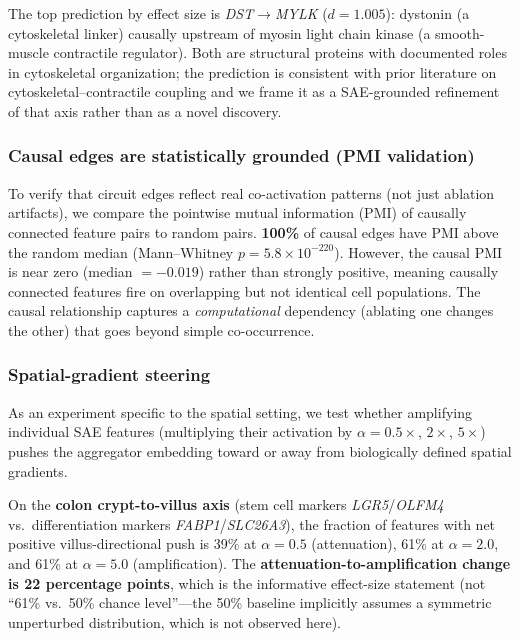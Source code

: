 \documentclass[11pt]{article}
\begin{document}
The top prediction by effect size is \emph{DST}$\to$\emph{MYLK}
($d = 1.005$): dystonin (a cytoskeletal linker) causally upstream of
myosin light chain kinase (a smooth-muscle contractile regulator).
Both are structural proteins with documented roles in cytoskeletal
organization; the prediction is consistent with prior literature on
cytoskeletal--contractile coupling and we frame it as a SAE-grounded
refinement of that axis rather than as a novel discovery.

\subsubsection{Causal edges are statistically grounded (PMI validation)}

To verify that circuit edges reflect real co-activation patterns (not
just ablation artifacts), we compare the pointwise mutual information
(PMI) of causally connected feature pairs to random pairs.
\textbf{100\%} of causal edges have PMI above the random median
(Mann--Whitney $p = 5.8 \times 10^{-220}$). However, the causal PMI
is near zero (median $= -0.019$) rather than strongly positive,
meaning causally connected features fire on overlapping but not
identical cell populations. The causal relationship captures a
\emph{computational} dependency (ablating one changes the other) that
goes beyond simple co-occurrence.

\subsubsection{Spatial-gradient steering}

As an experiment specific to the spatial setting, we test whether
amplifying individual SAE features (multiplying their activation by
$\alpha = 0.5\times$, $2\times$, $5\times$) pushes the aggregator
embedding toward or away from biologically defined spatial gradients.

On the \textbf{colon crypt-to-villus axis} (stem cell markers
\emph{LGR5}/\emph{OLFM4} vs.\ differentiation markers
\emph{FABP1}/\emph{SLC26A3}), the fraction of features with net
positive villus-directional push is 39\% at $\alpha = 0.5$
(attenuation), 61\% at $\alpha = 2.0$, and 61\% at $\alpha = 5.0$
(amplification). The \textbf{attenuation-to-amplification change is
22 percentage points}, which is the informative effect-size statement
(not ``61\% vs.\ 50\% chance level''---the 50\% baseline implicitly
assumes a symmetric unperturbed distribution, which is not observed
here).
\end{document}
